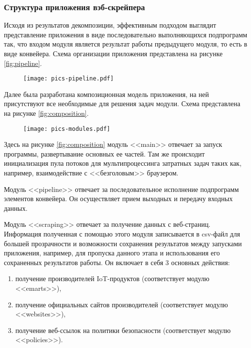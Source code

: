 \documentclass[../main]{subfiles}
\begin{document}
\subsubsection{Структура приложения вэб-скрейпера}
Исходя из результатов декомпозиции, эффективным подходом выглядит представление приложения в виде последовательно выполняющихся подпрограмм так, что входом модуля является результат работы предыдуще\-го модуля, то есть в виде конвейера. Схема организации приложения предста\-влена на рисунке \ref{fig:pipeline}.

\begin{figure}[H]
    \centering
    {\texttt{[image: pics-pipeline.pdf]}}
    \vspace{-\baselineskip}
\end{figure}

Далее была разработана композиционная модель приложения, на ней присутствуют все необходимые для решения задач модули. Схема представлена на рисунке \ref{fig:composition}.

\begin{figure}[H]
    \centering
    {\texttt{[image: pics-modules.pdf]}}
    \vspace{-\baselineskip}
\end{figure}

Здесь на рисунке \ref{fig:composition} модуль <<main>> отвечает за запуск программы, развертывание основных ее частей. Там же происходит инициализация пула потоков для мультипроцессинга затратных задач таких как, например, взаимодействие с <<безголовым>> браузером.

Модуль <<pipeline>> отвечает за последовательное исполнение подпрограмм элементов конвейера. Он осуществляет прием выходных и передачу входных данных.

Модуль <<scraping>> отвечает за получение данных с веб-страниц. Информация полученная с помощью этого модуля записывается в csv-файл для большей прозрачности и возможности сохранения результатов между запусками приложения, например, для пропуска данного этапа и использования его сохраненных результатов работы. Он включает в себя 3 основных действия:
\begin{enumerate}
    \item получение производителей IoT-продуктов (соответствует модулю <<e\-marts>>),
    \item получение официальных сайтов производителей (соответствует модулю <<websites>>),
    \item получение веб-ссылок на политики безопасности (соответствует модулю <<policies>>).
\end{enumerate}
\end{document}
